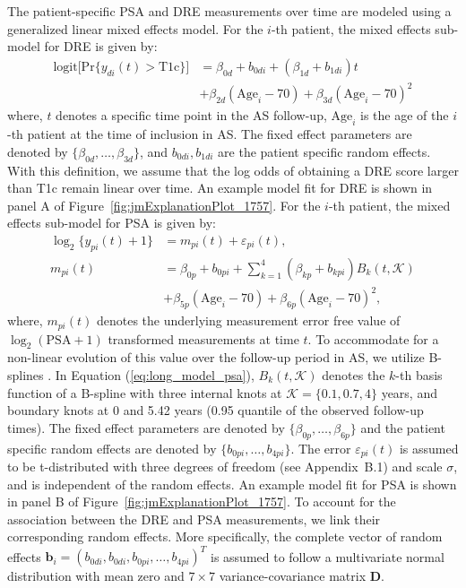 The patient-specific PSA and DRE measurements over time are modeled using a generalized linear mixed effects model. For the $i$-th patient, the mixed effects sub-model for DRE is given by:
\begin{equation}
\label{eq:long_model_dre}
\begin{split}
    \mbox{logit} \big[\mbox{Pr}\{y_{di}(t) > \mbox{T1c}\}\big] &= \beta_{0d} + b_{0di} + (\beta_{1d} + b_{1di}) t\\
    &+ \beta_{2d} (\mbox{Age}_i-70) + \beta_{3d} (\mbox{Age}_i-70)^2
    \end{split}
\end{equation}
where, $t$ denotes a specific time point in the AS follow-up, $\mbox{Age}_i$ is the age of the $i$-th patient at the time of inclusion in AS. The fixed effect parameters are denoted by $\{\beta_{0d}, \ldots, \beta_{3d}\}$, and $b_{0di}, b_{1di}$ are the patient specific random effects. With this definition, we assume that the log odds of obtaining a DRE score larger than T1c remain linear over time. An example model fit for DRE is shown in panel A of Figure~\ref{fig:jmExplanationPlot_1757}. For the $i$-th patient, the mixed effects sub-model for PSA is given by:
\begin{equation}
\label{eq:long_model_psa}
\begin{split}
    \log_2 \big\{y_{pi}(t) + 1\big\} &= m_{pi}(t) + \varepsilon_{pi}(t),\\
    m_{pi}(t) &= \beta_{0p} + b_{0pi} + \sum_{k=1}^4 (\beta_{kp} + b_{kpi})  B_k(t,\mathcal{K})\\ 
    &+ \beta_{5p} (\mbox{Age}_i-70) + \beta_{6p} (\mbox{Age}_i-70)^2,
    \end{split}
\end{equation}
where, $m_{pi}(t)$ denotes the underlying measurement error free value of $\log_2 (\mbox{PSA} + 1)$ transformed \citep{pearson1994mixed,lin2000latent} measurements at time $t$. To accommodate for a non-linear evolution of this value over the follow-up period in AS, we utilize B-splines \citep{de1978practical}. In Equation (\ref{eq:long_model_psa}), $B_k(t, \mathcal{K})$ denotes the $k$-th basis function of a B-spline with three internal knots at $\mathcal{K} = \{0.1, 0.7, 4\}$ years, and boundary knots at 0 and 5.42 years (0.95 quantile of the observed follow-up times). The fixed effect parameters are denoted by $\{\beta_{0p},\ldots,\beta_{6p}\}$ and the patient specific random effects are denoted by $\{b_{0pi}, \ldots, b_{4pi}\}$. The error $\varepsilon_{pi}(t)$ is assumed to be t-distributed with three degrees of freedom (see Appendix~B.1) and scale $\sigma$, and is independent of the random effects. An example model fit for PSA is shown in panel B of Figure~\ref{fig:jmExplanationPlot_1757}. To account for the association between the DRE and PSA measurements, we link their corresponding random effects. More specifically, the complete vector of random effects ${\boldsymbol{b}_i = (b_{0di}, b_{0di}, b_{0pi}, \ldots, b_{4pi})^T}$ is assumed to follow a multivariate normal distribution with mean zero and ${7\times 7}$ variance-covariance matrix $\boldsymbol{D}$.
